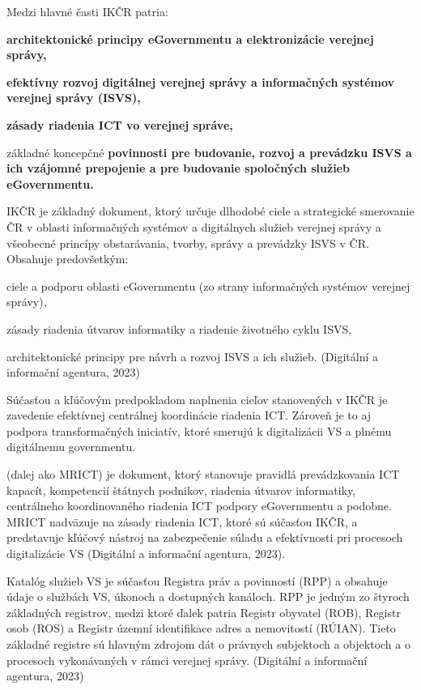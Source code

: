\blank
Medzi hlavné časti IKČR patria:

\startitemize
\item{\start\bf architektonické principy \stop eGovernmentu a elektronizácie verejnej správy,}
\item{\start \bf efektívny rozvoj \stop digitálnej verejnej správy a informačných systémov verejnej správy (ISVS),}
\item{\start\bf zásady \stop riadenia ICT vo verejnej správe,}
\item{základné koncepčné \start \bf povinnosti \stop pre budovanie, rozvoj a prevádzku ISVS a ich vzájomné prepojenie a pre budovanie spoločných služieb eGovernmentu.}
\stopitemize

IKČR je základný dokument, ktorý určuje dlhodobé ciele a strategické smerovanie ČR v oblasti informačných systémov a digitálnych služieb verejnej správy a všeobecné princípy obstarávania, tvorby, správy a prevádzky ISVS v ČR. Obsahuje predovšetkým:
\startitemize
\item{ciele a podporu oblasti eGovernmentu (zo strany informačných systémov verejnej správy),}
\item{zásady riadenia útvarov informatiky a riadenie životného cyklu ISVS,}
\item{architektonické principy pre návrh a rozvoj ISVS a ich služieb. \scr(Digitální a informační agentura, 2023)}
\stopitemize

Súčasťou a kľúčovým predpokladom naplnenia cieľov stanovených v IKČR je zavedenie efektívnej centrálnej koordinácie riadenia ICT. Zároveň je to aj podpora transformačných iniciatív, ktoré smerujú k digitalizácii VS a plnému digitálnemu governmentu.

 (ďalej ako MRICT) je dokument, ktorý stanovuje pravidlá prevádzkovania ICT kapacít, kompetencií štátnych podnikov, riadenia útvarov informatiky, centrálneho koordinovaného riadenia ICT podpory eGovernmentu a podobne. MRICT nadväzuje na zásady riadenia ICT, ktoré sú súčasťou IKČR, a predstavuje kľúčový nástroj na zabezpečenie súladu a efektívnosti pri procesoch digitalizácie VS \scr(Digitální a informační agentura, 2023).

Katalóg služieb VS je súčasťou Registra práv a povinností (RPP) a obsahuje údaje o službách VS, úkonoch a dostupných kanáloch. RPP je jedným zo štyroch základných registrov, medzi ktoré ďalek patria Registr obyvatel (ROB), Registr osob (ROS) a Registr územní identifikace adres a nemovitostí (RÚIAN). Tieto základné registre sú hlavným zdrojom dát o právnych subjektoch a objektoch a o procesoch vykonávaných v rámci verejnej správy. \scr(Digitální a informační agentura, 2023)

